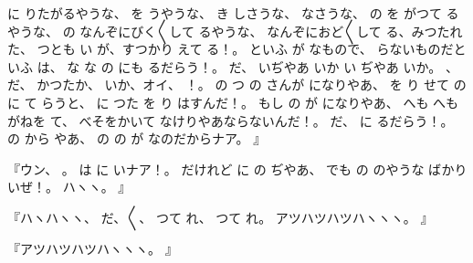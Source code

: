 に
りたがるやうな、
を
うやうな、
き
しさうな、
なさうな、
の
を
がつて
るやうな、
の
なんぞにびく〳〵して
るやうな、
なんぞにおど〳〵して
る、みつたれた、
つとも
い
が、すつかり
えて
る！。
といふ
が
なもので、
らないものだといふ
は、
な
な
の
にも
るだらう！。
だ、
いぢやあ
いか
い
ぢやあ
いか。
、
だ、
かつたか、
いか、オイ、
！。
の
つ
の
さんが
になりやあ、
を
り
せて
の
に
て
らうと、
に
つた
を
り
はすんだ！。
もし
の
が
になりやあ、
へも
へも
がねを
て、
べそをかいて
なけりやあならないんだ！。
だ、
に
るだらう！。
の
から
やあ、
の
の
が
なのだからナア。
』

『ウン、
。
は
に
いナア！。
だけれど
に
の
ぢやあ、
でも
の
のやうな
ばかり
いぜ！。
ハヽヽ。
』

『ハヽハヽヽ、
だ、〳〵、
つて
れ、
つて
れ。
アツハツハツハヽヽヽ。
』

『アツハツハツハヽヽヽ。
』

